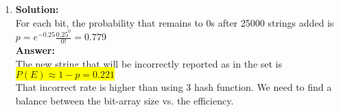 \documentclass{article}
\newcommand{\myansw}{\textbf{Answer:}\\}
\newcommand{\mysolu}{\textbf{Solution:}\\}
\begin{document}
\begin{enumerate}
\begin{enumerate}
		$p= e^{-0.75}\frac{0.75^0}{0!} = 0.4724$\\
		Let $\lambda = np = 4.724\times 10^4$\\
		The probability that $X = i$ bucket have no string been hashed into is\\
		${P(\{X=i\}) =\frac{e^{-\lambda}\lambda^i}{i!}}$\\
		${P(E\{X=i\}) = \frac{(n-i)^3}{n^3} \frac{e^{-\lambda}\lambda^i}{i!}}$\\
		${P(E) = \sum\limits_{i=0}^{+\infty}P(E\{X=i\})=
			 \sum\limits_{i=0}^{+\infty}\frac{e^{-\lambda}\lambda^i}{i!}-
			 \frac{1}{n}\sum\limits_{i=0}^{+\infty}\frac{3ie^{-\lambda}\lambda^i}{i!}+
			 \frac{1}{n^2}\sum\limits_{i=0}^{+\infty}\frac{3i^2e^{-\lambda}\lambda^i}{i!}-
			\frac{1}{n^3} \sum\limits_{i=0}^{+\infty}\frac{i^3e^{-\lambda}\lambda^i}{i!}}$\\
		
		${P(E) =
			1-
			\frac{3}{n}E[X]+
			\frac{3}{n^2}E[X^2]-
			\frac{1}{n^3}E[X^3]}$\\
		${\frac{1}{n^3}E[X^3] = \frac{\lambda}{n^3}\sum\limits_{i=1}^{+\infty}\frac{i^2e^{-\lambda}\lambda^{(i-1)}}{(i-1)!}=\frac{\lambda}{n^3}\sum\limits_{i=1}^{+\infty}(\frac{(i-1)^2e^{-\lambda}\lambda^{(i-1)}}{(i-1)!}+\frac{2(i-1)e^{-\lambda}\lambda^{(i-1)}}{(i-1)!}+\frac{e^{-\lambda}\lambda^{(i-1)}}{(i-1)!})}$\\
		${\frac{1}{n^3}E[X^3] = \frac{\lambda}{n^3}(E[X^2] + 2E[X]-1)=\frac{\lambda}{n^3}(\lambda(\lambda+1) + 2\lambda+1)=\frac{1}{n^3}(\lambda^3+3\lambda^2+\lambda)}$\\
		${P(E) = 1 - \frac{3}{n}\lambda + \frac{3}{n^2}\lambda(\lambda+1) - \frac{1}{n^3}(\lambda^3+3\lambda^2+\lambda)}$\\
		${P(E) \approx 1 - \frac{3}{n}\lambda + 3(\frac{\lambda}{n})^2 -  (\frac{\lambda}{n})^3= 1 - 3p + 3p^2 - p^3}$\\
		\myansw
		\colorbox{yellow}{${P(E) \approx 0.147}$}\\
		The anwser is as same as the simple way that just use the probability that all the 3 hash functions hits the bits changed to 1s.\\
		${P(E) = (1-\frac{E[X]}{n})^3 = (1-p)^3}$
		\item
		\mysolu
		For each bit, the probability that remains to 0s after 25000 strings added is\\
		$p= e^{-0.25}\frac{0.25^0}{0!} = 0.779$\\
		\myansw
		The new string that will be incorrectly reported as in the set is\\ 
		\colorbox{yellow}{${P(E) \approx 1 - p = 0.221}$}\\
		That incorrect rate is higher than using 3 hash function. We need to find a balance between the bit-array size vs. the efficiency.\\


\end{enumerate}
\end{enumerate}
\end{document}
